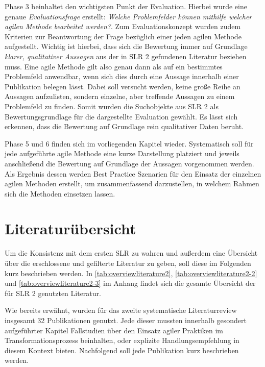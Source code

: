 Phase 3 beinhaltet den wichtigsten Punkt der Evaluation. Hierbei wurde eine genaue \textit{Evaluationsfrage} erstellt: \textit{Welche Problemfelder können mithilfe welcher agilen Methode bearbeitet werden?}. Zum Evaluationskonzept wurden zudem Kriterien zur Beantwortung der Frage bezüglich einer jeden agilen Methode aufgestellt. Wichtig ist hierbei, dass sich die Bewertung immer auf Grundlage \textit{klarer, qualitativer Aussagen} aus der in SLR 2 gefundenen Literatur beziehen muss. Eine agile Methode gilt also genau dann als auf ein bestimmtes Problemfeld anwendbar, wenn sich dies durch eine Aussage innerhalb einer Publikation belegen lässt. Dabei soll versucht werden, keine große Reihe an Aussagen aufzulisten, sondern einzelne, aber treffende Aussagen zu einem Problemfeld zu finden. Somit wurden die Suchobjekte aus SLR 2 als Bewertungsgrundlage für die dargestellte Evaluation gewählt.  Es lässt sich erkennen, dass die Bewertung auf Grundlage rein qualitativer Daten beruht.

Phase 5 und 6 finden sich im vorliegenden Kapitel wieder. Systematisch soll für jede aufgeführte agile Methode eine kurze Darstellung platziert und jeweils anschließend die Bewertung auf Grundlage der Aussagen vorgenommen werden. Als Ergebnis dessen werden Best Practice Szenarien für den Einsatz der einzelnen agilen Methoden erstellt, um zusammenfassend darzustellen, in welchem Rahmen sich die Methoden einsetzen lassen.


\section{Literaturübersicht}


Um die Konsistenz mit dem ersten SLR  zu wahren  und außerdem eine Übersicht über die erschlossene und  gefilterte Literatur zu geben, soll diese im Folgenden kurz beschrieben werden. In  \ref{tab:overviewliterature2}, \ref{tab:overviewliterature2-2} und \ref{tab:overviewliterature2-3} im Anhang findet sich die  gesamte Übersicht der für SLR 2 genutzten Literatur.

Wie bereits erwähnt, wurden für das zweite systematische Literaturreview insgesamt 32 Publikationen genutzt. Jede dieser mussten innerhalb gesondert aufgeführter Kapitel Fallstudien über den Einsatz agiler Praktiken im Transformationsprozess beinhalten, oder explizite Handlungsempfehlung in diesem Kontext bieten. Nachfolgend soll jede Publikation kurz beschrieben werden.

